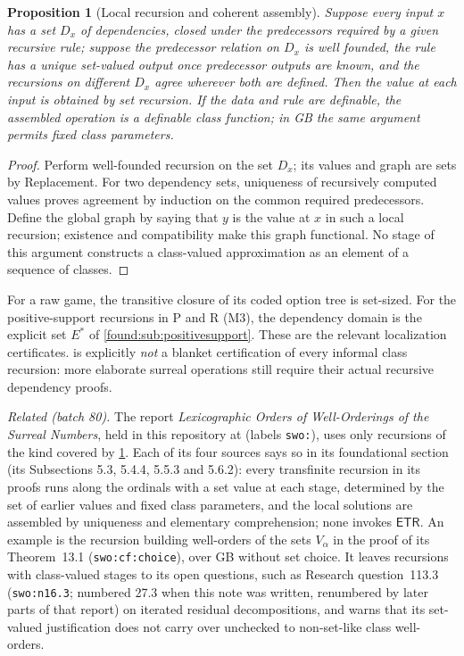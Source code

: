 \documentclass[11pt,letterpaper]{article}
\numberwithin{equation}{section}
\newtheorem{proposition}[theorem]{Proposition}
\theoremstyle{definition}
\theoremstyle{remark}
\newcommand{\ETR}{\mathsf{ETR}}
\begin{document}
\begin{proposition}[Local recursion and coherent assembly]\label{found:prop:recursion}
Suppose every input $x$ has a set $D_x$ of dependencies, closed under the
predecessors required by a given recursive rule; suppose the predecessor
relation on $D_x$ is well founded, the rule has a unique set-valued output once
predecessor outputs are known, and the recursions on different $D_x$ agree
wherever both are defined. Then the value at each input is obtained by set
recursion. If the data and rule are definable, the assembled operation is a
definable class function; in GB the same argument permits fixed class
parameters.
\end{proposition}
\begin{proof}
Perform well-founded recursion on the set $D_x$; its values and graph are sets
by Replacement. For two dependency sets, uniqueness of recursively computed
values proves agreement by induction on the common required predecessors.
Define the global graph by saying that $y$ is the value at $x$ in such a local
recursion; existence and compatibility make this graph functional. No stage of
this argument constructs a class-valued approximation as an element of a
sequence of classes.
\end{proof}

For a raw game, the transitive closure of its coded option tree is set-sized.
For the positive-support recursions in P and R (M3), the dependency domain is
the explicit set $E^*$ of \cref{found:sub:positivesupport}. These are the
relevant localization certificates.  is explicitly
\emph{not} a blanket certification of every informal class recursion: more
elaborate surreal operations still require their actual recursive dependency
proofs.

\emph{Related (batch 80).} The report \emph{Lexicographic Orders of
Well-Orderings of the Surreal Numbers}, held in this repository at
(labels \texttt{swo:}), uses only recursions of the kind covered by
\cref{found:prop:recursion}. Each of its four sources says so in its
foundational section (its Subsections 5.3, 5.4.4, 5.5.3 and 5.6.2): every
transfinite recursion in its proofs runs along the ordinals with a set value
at each stage, determined by the set of earlier values and fixed class
parameters, and the local solutions are assembled by uniqueness and elementary
comprehension; none invokes $\ETR$. An example is the recursion building
well-orders of the sets $V_\alpha$ in the proof of its Theorem~13.1
(\texttt{swo:cf:choice}), over GB without set choice. It leaves recursions with
class-valued stages to its open questions, such as Research question~113.3
(\texttt{swo:n16.3}; numbered 27.3 when this note was written, renumbered by
later parts of that report) on iterated residual decompositions, and warns that its
set-valued justification does not carry over unchecked to non-set-like class
well-orders.
\end{document}
